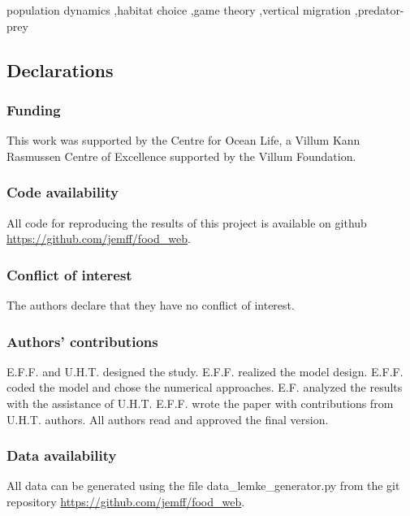 \documentclass[review,authoryear]{elsarticle}
\begin{document}
\begin{keyword} population dynamics \sep habitat choice \sep game theory \sep vertical migration \sep predator-prey %
\end{keyword}


\maketitle




\linenumbers{}
\modulolinenumbers[3]






%
\subsection*{Declarations}
\subsubsection*{Funding}
This work was supported by the Centre for Ocean Life,
a Villum Kann Rasmussen Centre of Excellence supported
by the Villum Foundation.
\subsubsection*{Code availability}
All code for reproducing the results of this project is available on github \url{https://github.com/jemff/food_web}.
\subsubsection*{Conflict of interest}
The authors declare that they have no conflict of interest.
\subsubsection*{Authors' contributions}
E.F.F. and U.H.T. designed the study. E.F.F. realized the model design. E.F.F. coded the model and chose the numerical approaches. E.F. analyzed the results with the assistance of U.H.T.  E.F.F. wrote the paper with contributions from U.H.T. authors. All authors read and approved the final version.
\subsubsection*{Data availability}
All data can be generated using the file data_lemke_generator.py  from the git repository \url{https://github.com/jemff/food_web}.




\end{document}

